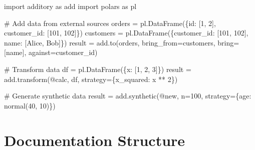 \documentclass[
  letterpaper,
]{scrbook}
\newenvironment{Shaded}{\begin{snugshade}}{\end{snugshade}}
\newcommand{\CommentTok}[1]{\textcolor[rgb]{0.37,0.37,0.37}{#1}}
\newcommand{\DecValTok}[1]{\textcolor[rgb]{0.68,0.00,0.00}{#1}}
\newcommand{\ImportTok}[1]{\textcolor[rgb]{0.00,0.46,0.62}{#1}}
\newcommand{\NormalTok}[1]{\textcolor[rgb]{0.00,0.23,0.31}{#1}}
\newcommand{\OperatorTok}[1]{\textcolor[rgb]{0.37,0.37,0.37}{#1}}
\newcommand{\StringTok}[1]{\textcolor[rgb]{0.13,0.47,0.30}{#1}}
\begin{document}
\begin{Shaded}
\begin{Highlighting}[]
\ImportTok{import}\NormalTok{ additory }\ImportTok{as}\NormalTok{ add}
\ImportTok{import}\NormalTok{ polars }\ImportTok{as}\NormalTok{ pl}

\CommentTok{\# Add data from external sources}
\NormalTok{orders }\OperatorTok{=}\NormalTok{ pl.DataFrame(\{}\StringTok{\textquotesingle{}id\textquotesingle{}}\NormalTok{: [}\DecValTok{1}\NormalTok{, }\DecValTok{2}\NormalTok{], }\StringTok{\textquotesingle{}customer\_id\textquotesingle{}}\NormalTok{: [}\DecValTok{101}\NormalTok{, }\DecValTok{102}\NormalTok{]\})}
\NormalTok{customers }\OperatorTok{=}\NormalTok{ pl.DataFrame(\{}\StringTok{\textquotesingle{}customer\_id\textquotesingle{}}\NormalTok{: [}\DecValTok{101}\NormalTok{, }\DecValTok{102}\NormalTok{], }\StringTok{\textquotesingle{}name\textquotesingle{}}\NormalTok{: [}\StringTok{\textquotesingle{}Alice\textquotesingle{}}\NormalTok{, }\StringTok{\textquotesingle{}Bob\textquotesingle{}}\NormalTok{]\})}
\NormalTok{result }\OperatorTok{=}\NormalTok{ add.to(orders, bring\_from}\OperatorTok{=}\NormalTok{customers, bring}\OperatorTok{=}\NormalTok{[}\StringTok{\textquotesingle{}name\textquotesingle{}}\NormalTok{], against}\OperatorTok{=}\StringTok{\textquotesingle{}customer\_id\textquotesingle{}}\NormalTok{)}

\CommentTok{\# Transform data}
\NormalTok{df }\OperatorTok{=}\NormalTok{ pl.DataFrame(\{}\StringTok{\textquotesingle{}x\textquotesingle{}}\NormalTok{: [}\DecValTok{1}\NormalTok{, }\DecValTok{2}\NormalTok{, }\DecValTok{3}\NormalTok{]\})}
\NormalTok{result }\OperatorTok{=}\NormalTok{ add.transform(}\StringTok{\textquotesingle{}@calc\textquotesingle{}}\NormalTok{, df, strategy}\OperatorTok{=}\NormalTok{\{}\StringTok{\textquotesingle{}x\_squared\textquotesingle{}}\NormalTok{: }\StringTok{\textquotesingle{}x ** 2\textquotesingle{}}\NormalTok{\})}

\CommentTok{\# Generate synthetic data}
\NormalTok{result }\OperatorTok{=}\NormalTok{ add.synthetic(}\StringTok{\textquotesingle{}@new\textquotesingle{}}\NormalTok{, n}\OperatorTok{=}\DecValTok{100}\NormalTok{, strategy}\OperatorTok{=}\NormalTok{\{}\StringTok{\textquotesingle{}age\textquotesingle{}}\NormalTok{: }\StringTok{\textquotesingle{}normal(40, 10)\textquotesingle{}}\NormalTok{\})}
\end{Highlighting}
\end{Shaded}

\section*{Documentation Structure}\label{documentation-structure}
\end{document}
